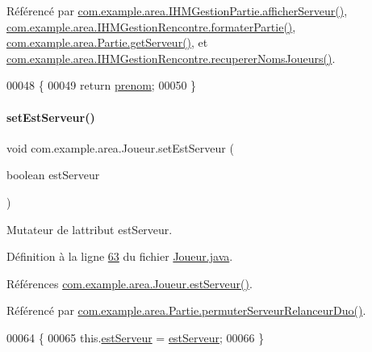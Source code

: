 Référencé par \hyperlink{_i_h_m_gestion_partie_8java_source_l00447}{com.\+example.\+area.\+I\+H\+M\+Gestion\+Partie.\+afficher\+Serveur()}, \hyperlink{_i_h_m_gestion_rencontre_8java_source_l00343}{com.\+example.\+area.\+I\+H\+M\+Gestion\+Rencontre.\+formater\+Partie()}, \hyperlink{_partie_8java_source_l00334}{com.\+example.\+area.\+Partie.\+get\+Serveur()}, et \hyperlink{_i_h_m_gestion_rencontre_8java_source_l00281}{com.\+example.\+area.\+I\+H\+M\+Gestion\+Rencontre.\+recuperer\+Noms\+Joueurs()}.


\begin{DoxyCode}
00048       \{
00049           \textcolor{keywordflow}{return} \hyperlink{classcom_1_1example_1_1area_1_1_joueur_a9a49f14719dfc48cf557ef8677e2b2bc}{prenom};
00050       \}
\end{DoxyCode}
\mbox{\label{classcom_1_1example_1_1area_1_1_joueur_aa0ae3b52616cc034cd6270eade9a1be7}} 
\paragraph{\texorpdfstring{set\+Est\+Serveur()}{setEstServeur()}}
{\footnotesize\ttfamily void com.\+example.\+area.\+Joueur.\+set\+Est\+Serveur (\begin{DoxyParamCaption}\item[{boolean}]{est\+Serveur }\end{DoxyParamCaption})}



Mutateur de l\textquotesingle{}attribut est\+Serveur. 



Définition à la ligne \hyperlink{_joueur_8java_source_l00063}{63} du fichier \hyperlink{_joueur_8java_source}{Joueur.\+java}.



Références \hyperlink{_joueur_8java_source_l00055}{com.\+example.\+area.\+Joueur.\+est\+Serveur()}.



Référencé par \hyperlink{_partie_8java_source_l00293}{com.\+example.\+area.\+Partie.\+permuter\+Serveur\+Relanceur\+Duo()}.


\begin{DoxyCode}
00064     \{
00065         this.\hyperlink{classcom_1_1example_1_1area_1_1_joueur_ad35bff2a14331bada30ccc164d25f50f}{estServeur} = \hyperlink{classcom_1_1example_1_1area_1_1_joueur_ad35bff2a14331bada30ccc164d25f50f}{estServeur};
00066     \}
\end{DoxyCode}


